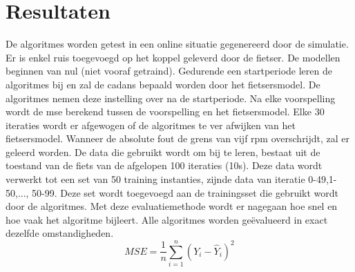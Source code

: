 \chapter{Resultaten}
De algoritmes worden getest in een online situatie gegenereerd door de simulatie. Er is enkel ruis toegevoegd op het koppel geleverd door de fietser. De modellen beginnen van nul (niet vooraf getraind). Gedurende een startperiode leren de algoritmes bij en zal de cadans bepaald worden door het fietsersmodel. De algoritmes nemen deze instelling over na de startperiode. Na elke voorspelling wordt de \gls{mse} berekend tussen de voorspelling en het fietsersmodel. Elke 30 iteraties wordt er afgewogen of de algoritmes te ver afwijken van het fietsersmodel. Wanneer de absolute fout de grens van vijf rpm overschrijdt, zal er geleerd worden. De data die gebruikt wordt om bij te leren, bestaat uit de toestand van de fiets van de afgelopen 100 iteraties (10s). Deze data wordt verwerkt tot een set van 50 training instanties, zijnde data van iteratie 0-49,1-50,..., 50-99. Deze set wordt toegevoegd aan de trainingsset die gebruikt wordt door de algoritmes. Met deze evaluatiemethode wordt er nagegaan hoe snel en hoe vaak het algoritme bijleert. Alle algoritmes worden geëvalueerd in exact dezelfde omstandigheden.
\[MSE = \frac{1}{n} \sum_{i=1}^{n} (Y_i-\hat{Y}_i)^2\]

